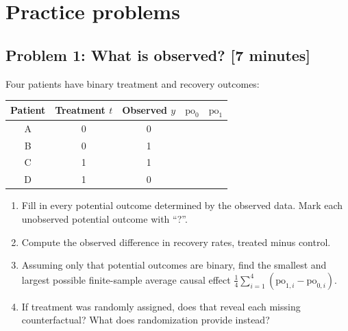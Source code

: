 \documentclass[11pt]{article}
\newcommand{\workingspace}[1]{}
\newcommand{\workingspace}[1]{\vspace{#1}}
\begin{document}
\newpage
\section*{Practice problems}

\subsection*{Problem 1: What is observed? \hfill [7 minutes]}
Four patients have binary treatment and recovery outcomes:
\begin{center}
\begin{tabular}{@{}ccccc@{}}
\toprule
Patient & Treatment $t$ & Observed $y$ & $\mathrm{po}_0$ & $\mathrm{po}_1$ \\
\midrule
A & 0 & 0 & \phantom{0} & \phantom{0} \\
B & 0 & 1 & \phantom{0} & \phantom{0} \\
C & 1 & 1 & \phantom{0} & \phantom{0} \\
D & 1 & 0 & \phantom{0} & \phantom{0} \\
\bottomrule
\end{tabular}
\end{center}
\begin{enumerate}[label=(\alph*),itemsep=0.4em]
  \item Fill in every potential outcome determined by the observed data. Mark
        each unobserved potential outcome with ``?''.
  \item Compute the observed difference in recovery rates, treated minus control.
  \item Assuming only that potential outcomes are binary, find the smallest and
        largest possible finite-sample average causal effect
        $\frac14\sum_{i=1}^4(\mathrm{po}_{1,i}-\mathrm{po}_{0,i})$.
  \item If treatment was randomly assigned, does that reveal each missing
        counterfactual? What does randomization provide instead?
\end{enumerate}
\workingspace{5.0cm}
\end{document}
